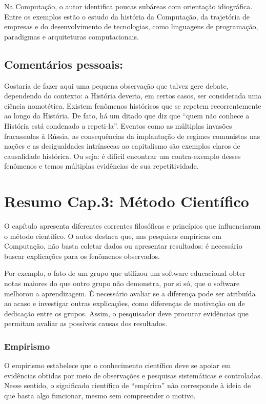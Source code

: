 \documentclass[12pt,a4paper]{article}
\begin{document}
Na Computação, o autor identifica poucas subáreas com orientação idiográfica. Entre os exemplos estão o estudo da história da Computação, da trajetória de empresas e do desenvolvimento de tecnologias, como linguagens de programação, paradigmas e arquiteturas computacionais.

\subsection{Comentários pessoais:}
Gostaria de fazer aqui uma pequena observação que talvez gere debate, dependendo do contexto: a História deveria, em certos casos, ser considerada uma ciência nomotética. Existem fenômenos históricos que se repetem recorrentemente ao longo da História. De fato, há um ditado que diz que “quem não conhece a História está condenado a repeti-la”. Eventos como as múltiplas invasões fracassadas à Rússia, as consequências da implantação de regimes comunistas nas nações e as desigualdades intrínsecas ao capitalismo são exemplos claros de causalidade histórica. Ou seja: é difícil encontrar um contra-exemplo desses fenômenos e temos múltiplas evidências de sua repetitividade.

\section{Resumo Cap.3: Método Científico}

O capítulo apresenta diferentes correntes filosóficas e princípios que influenciaram o método científico. O autor destaca que, nas pesquisas empíricas em Computação, não basta coletar dados ou apresentar resultados: é necessário buscar explicações para os fenômenos observados.

Por exemplo, o fato de um grupo que utilizou um software educacional obter notas maiores do que outro grupo não demonstra, por si só, que o software melhorou a aprendizagem. É necessário avaliar se a diferença pode ser atribuída ao acaso e investigar outras explicações, como diferenças de motivação ou de dedicação entre os grupos. Assim, o pesquisador deve procurar evidências que permitam avaliar as possíveis causas dos resultados.

\subsubsection{Empirismo}

O empirismo estabelece que o conhecimento científico deve se apoiar em evidências obtidas por meio de observações e pesquisas sistemáticas e controladas. Nesse sentido, o significado científico de ``empírico'' não corresponde à ideia de que basta algo funcionar, mesmo sem compreender o motivo.
\end{document}
